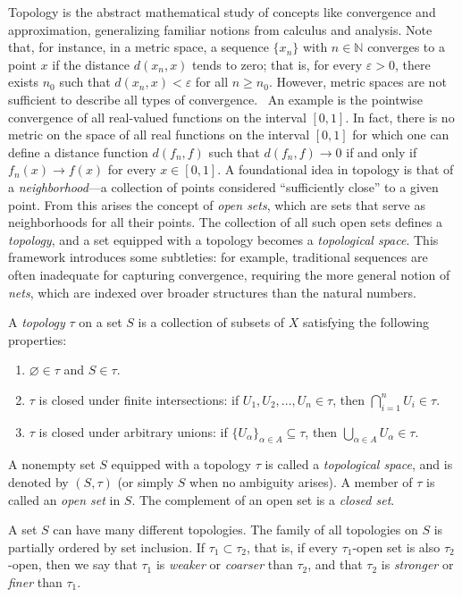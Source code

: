 Topology is the abstract mathematical study of concepts like convergence and approximation, generalizing familiar notions from calculus and analysis. 
Note that, for instance, in a metric space, a sequence $\{x_n\}$ with $n \in \mathbb{N}$ converges to a point $x$ if the distance $d(x_n, x)$ tends to zero; that is, for every $\varepsilon > 0$, there exists $n_0$ such that $d(x_n, x) < \varepsilon$ for all $n \geq n_0$. However, metric spaces are not sufficient to describe all types of convergence.  An example is the pointwise convergence of all real-valued functions on the interval $[0, 1]$. In fact, there is no metric on the space of all real functions on the interval $[0,1]$ for which one can define a distance function $d(f_n, f)$ such that $d(f_n, f) \to 0$ if and only if $f_n(x) \to f(x)$ for every $x \in [0, 1]$. 
A foundational idea in topology is that of a \emph{neighborhood}—a collection of points considered ``sufficiently close'' to a given point. From this arises the concept of \emph{open sets}, which are sets that serve as neighborhoods for all their points. The collection of all such open sets defines a \emph{topology}, and a set equipped with a topology becomes a \emph{topological space}. This framework introduces some subtleties: for example, traditional sequences are often inadequate for capturing convergence, requiring the more general notion of \emph{nets}, which are indexed over broader structures than the natural numbers.

\begin{definition}
  A \emph{topology} $\tau$ on a set $S$ is a collection of subsets of $X$ satisfying the following properties:
\begin{enumerate}
    \item $\varnothing \in \tau$ and $S \in \tau$.
    \item $\tau$ is closed under finite intersections: if $U_1, U_2, \dots, U_n \in \tau$, then $\bigcap_{i=1}^n U_i \in \tau$.
    \item $\tau$ is closed under arbitrary unions: if $\{U_\alpha\}_{\alpha \in A} \subseteq \tau$, then $\bigcup_{\alpha \in A} U_\alpha \in \tau$.
\end{enumerate}

A nonempty set $S$ equipped with a topology $\tau$ is called a \emph{topological space}, and is denoted by $(S, \tau)$ (or simply $S$ when no ambiguity arises). A member of $\tau$ is called an \emph{open set} in $S$. The complement of an open set is a \emph{closed set}. 

A set \( S \) can have many different topologies.  
The family of all topologies on \( S \) is partially ordered by set inclusion.  
If \( \tau_1 \subset \tau_2 \), that is, if every \( \tau_1 \)-open set is also \( \tau_2 \)-open,  
then we say that \( \tau_1 \) is \emph{weaker} or \emph{coarser} than \( \tau_2 \),  
and that \( \tau_2 \) is \emph{stronger} or \emph{finer} than \( \tau_1 \).
\end{definition}

